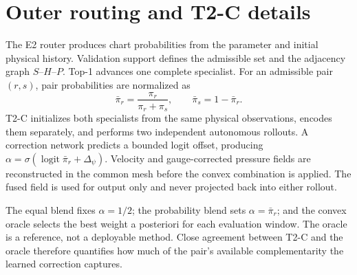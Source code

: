 \section{Outer routing and T2-C details}
\label{app:routing}

The E2 router produces chart probabilities from the parameter and initial physical history. Validation support defines the admissible set and the adjacency graph $S$--$H$--$P$. Top-1 advances one complete specialist. For an admissible pair $(r,s)$, pair probabilities are normalized as
\begin{equation}
 \bar\pi_r=\frac{\pi_r}{\pi_r+\pi_s},\qquad
 \bar\pi_s=1-\bar\pi_r.
\end{equation}
T2-C initializes both specialists from the same physical observations, encodes them separately, and performs two independent autonomous rollouts. A correction network predicts a bounded logit offset, producing $\alpha=\sigma(\operatorname{logit}\bar\pi_r+\Delta_\psi)$. Velocity and gauge-corrected pressure fields are reconstructed in the common mesh before the convex combination is applied. The fused field is used for output only and never projected back into either rollout.

The equal blend fixes $\alpha=1/2$; the probability blend sets $\alpha=\bar\pi_r$; and the convex oracle selects the best weight a posteriori for each evaluation window. The oracle is a reference, not a deployable method. Close agreement between T2-C and the oracle therefore quantifies how much of the pair's available complementarity the learned correction captures.
